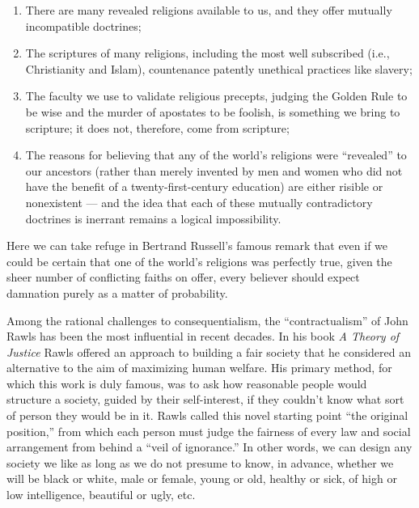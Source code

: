 \documentclass[a4paper,14pt]{extbook}
\begin{document}
\begin{enumerate}
      \item There are many revealed religions available to us, and they offer mutually incompatible doctrines;
      \item The scriptures of many religions, including the most well subscribed (i.e., Christianity and Islam), countenance patently unethical practices like slavery;
      \item The faculty we use to validate religious precepts, judging the Golden Rule to be wise and the murder of apostates to be foolish, is something we bring to scripture;
            it does not, therefore, come from scripture;
      \item The reasons for believing that any of the world's religions were ``revealed'' to our ancestors (rather than merely invented by men and women who did not have the benefit of a twenty-first-century education) are either risible or nonexistent --- and the idea that each of these mutually contradictory doctrines is inerrant remains a logical impossibility.
\end{enumerate}

Here we can take refuge in Bertrand Russell's famous remark that even if we could be certain that one of the world's religions was perfectly true, given the sheer number of conflicting faiths on offer, every believer should expect damnation purely as a matter of probability.

Among the rational challenges to consequentialism, the ``contractualism'' of John Rawls has been the most influential in recent decades.
In his book \textit{A Theory of Justice} Rawls offered an approach to building a fair society that he considered an alternative to the aim of maximizing human welfare.
His primary method, for which this work is duly famous, was to ask how reasonable people would structure a society, guided by their self-interest, if they couldn't know what sort of person they would be in it.
Rawls called this novel starting point ``the original position,'' from which each person must judge the fairness of every law and social arrangement from behind a ``veil of ignorance.''
In other words, we can design any society we like as long as we do not presume to know, in advance, whether we will be black or white, male or female, young or old, healthy or sick, of high or low intelligence, beautiful or ugly, etc.
\end{document}
